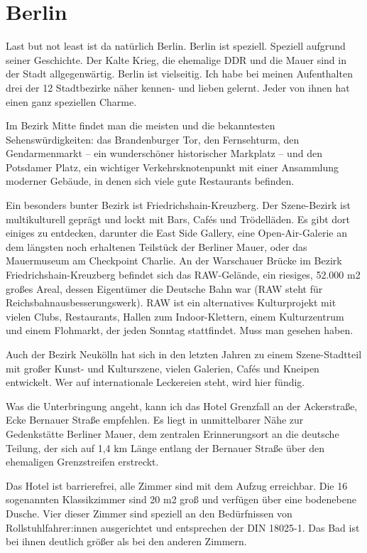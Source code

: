 \documentclass[fontsize=14pt,a4paper,headinclude,DIV=calc,automark]{scrbook}
\begin{document}
\section{Berlin}

Last but not least ist da natürlich Berlin. Berlin ist speziell. Speziell aufgrund seiner Geschichte. Der Kalte Krieg, die ehemalige DDR und die Mauer sind in der Stadt allgegenwärtig. Berlin ist vielseitig. Ich habe bei meinen Aufenthalten drei der 12 Stadtbezirke näher kennen- und lieben gelernt. Jeder von ihnen hat einen ganz speziellen Charme.

Im Bezirk Mitte findet man die meisten und die bekanntesten Sehenswürdigkeiten: das Brandenburger Tor, den Fernsehturm, den Gendarmenmarkt – ein wunderschöner historischer Markplatz – und den Potsdamer Platz, ein wichtiger Verkehrsknotenpunkt mit einer Ansammlung moderner Gebäude, in denen sich viele gute Restaurants befinden.

Ein besonders bunter Bezirk ist Friedrichshain-Kreuzberg. Der Szene-Bezirk ist multikulturell geprägt und lockt mit Bars, Cafés und Trödelläden. Es gibt dort einiges zu entdecken, darunter die East Side Gallery, eine Open-Air-Galerie an dem längsten noch erhaltenen Teilstück der Berliner Mauer, oder das Mauermuseum am Checkpoint Charlie. An der Warschauer Brücke im Bezirk Friedrichshain-Kreuzberg befindet sich das RAW-Gelände, ein riesiges, 52.000 m2 großes Areal, dessen Eigentümer die Deutsche Bahn war (RAW steht für Reichsbahnausbesserungswerk). RAW ist ein alternatives Kulturprojekt mit vielen Clubs, Restaurants, Hallen zum Indoor-Klettern, einem Kulturzentrum und einem Flohmarkt, der jeden Sonntag stattfindet. Muss man gesehen haben.

Auch der Bezirk Neukölln hat sich in den letzten Jahren zu einem Szene-Stadtteil mit großer Kunst- und Kulturszene, vielen Galerien, Cafés und Kneipen entwickelt. Wer auf internationale Leckereien steht, wird hier fündig.

Was die Unterbringung angeht, kann ich das Hotel Grenzfall an der Ackerstraße, Ecke Bernauer Straße empfehlen. Es liegt in unmittelbarer Nähe zur Gedenkstätte Berliner Mauer, dem zentralen Erinnerungsort an die deutsche Teilung, der sich auf 1,4 km Länge entlang der Bernauer Straße über den ehemaligen Grenzstreifen erstreckt.

Das Hotel ist barrierefrei, alle Zimmer sind mit dem Aufzug erreichbar. Die 16 sogenannten Klassikzimmer sind 20 m2 groß und verfügen über eine bodenebene Dusche. Vier dieser Zimmer sind speziell an den Bedürfnissen von Rollstuhlfahrer:innen ausgerichtet und entsprechen der DIN 18025-1. Das Bad ist bei ihnen deutlich größer als bei den anderen Zimmern.
\end{document}
